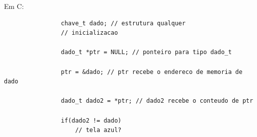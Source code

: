 \begin{frame}[fragile,label=notas]
	Em C:
	\begin{center}
		\begin{minipage}{.8\textwidth}
			\begin{lstlisting}
				chave_t dado; // estrutura qualquer
				// inicializacao
				
				dado_t *ptr = NULL; // ponteiro para tipo dado_t
				
				ptr = &dado; // ptr recebe o endereco de memoria de dado
				
				dado_t dado2 = *ptr; // dado2 recebe o conteudo de ptr
				
				if(dado2 != dado)
				    // tela azul?
			\end{lstlisting}
		\end{minipage}
	\end{center}
\end{frame}

		
		
		
		
		

